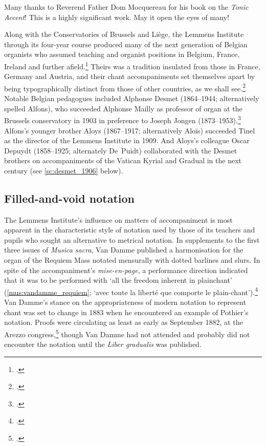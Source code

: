   {}
{Many thanks to Reverend Father Dom Mocquereau for his book on the \emph{Tonic Accent}! This is a highly significant work. May it open the eyes of many!}
%

Along with the Conservatories of Brussels and Liège, the Lemmens Institute through its four-year course produced many of the next generation of Belgian organists who assumed teaching and organist positions in Belgium, France, Ireland and further afield.\footcite[\S{}\S{}4.2, 4.4]{DeacyContinentalOrganistsCatholic2005}
Theirs was a tradition insulated from those in France, Germany and Austria, and their chant accompaniments set themselves apart by being typographically distinct from those of other countries, as we shall see.\footcite[11]{G.EdgarTinelessai}
%
Notable Belgian pedagogues included Alphonse Desmet (1864--1944; alternatively spelled Alfons), who succeeded Alphonse Mailly as professor of organ at the Brussels conservatory in 1903 in preference to Joseph Jongen (1873--1953).\footcite[66]{WhiteleyJosephJongenHis1997}
Alfons's younger brother Aloys (1867--1917; alternatively Aloïs) succeeded Tinel as the director of the Lemmens Institute in 1909.
And Aloys's colleague Oscar Depuydt (1858--1925; alternately De~Puidt) collaborated with the Desmet brothers on accompaniments of the Vatican Kyrial and Gradual in the next century (see \cref{sc:desmet_1906} below).
\noclub[2]

\subsection{Filled-and-void notation}
\label{hl:filled_and_void}\label{sc:publishing_libergradualis}\label{cc:filled_and_void}%
The Lemmens Institute's influence on matters of accompaniment is most apparent in the characteristic style of notation used by those of its teachers and pupils who sought an alternative to metrical notation.
In supplements to the first three issues of \emph{Musica sacra}, Van Damme published a harmonisation for the organ of the Requiem Mass notated mensurally with dotted barlines and slurs.
In spite of the accompaniment's \emph{mise-en-page}, a performance direction indicated that it was to be performed with `all the freedom inherent in plainchant' (\cref{mus:vandamme_requiem}; `avec toute la liberté que comporte le plain-chant').\footcite[1]{VanDammeOrdinariumMissaeMissa1881}
Van Damme's stance on the appropriateness of modern notation to represent chant was set to change in 1883 when he encountered an example of Pothier's notation.
Proofs were circulating as least as early as September 1882, at the Arezzo congress,\footcites[105]{CombeHistoirerestaurationchant1969}[88--9]{CombeRestorationGregorianChant2003} though Van Damme had not attended and probably did not encounter the notation until the \emph{Liber gradualis} was published.
\nowidow[2]

